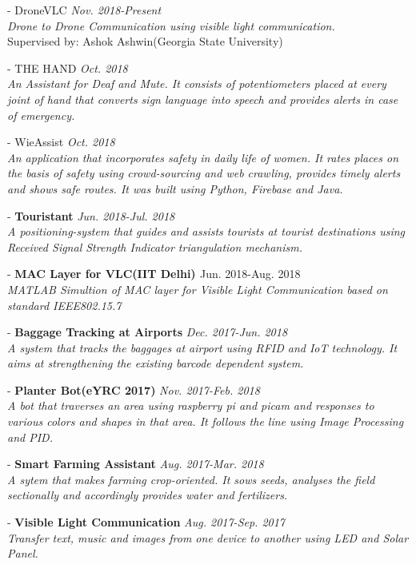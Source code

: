 \documentclass[margin, 10pt]{res} %
\begin{document}
\begin{resume}
- {DroneVLC}
{\sl \hfill {\normalfont Nov. 2018-Present}\\ Drone to Drone Communication using visible light communication.}\\Supervised by: Ashok Ashwin(Georgia State University)

- {THE HAND}
{\sl \hfill {\normalfont Oct. 2018}\\ An Assistant for Deaf and Mute.
It consists of potentiometers placed at every joint of hand that converts sign language into speech and provides alerts in case of emergency.}

- {WieAssist}
{\sl \hfill {\normalfont Oct. 2018}\\ An application that incorporates safety in daily life of women. 
It rates places on the basis of safety using crowd-sourcing and web crawling, provides timely alerts and shows safe routes. It was built using Python, Firebase and Java.}



- {\bf Touristant} 
{\sl \hfill {\normalfont Jun. 2018-Jul. 2018}\\ A positioning-system that guides and assists tourists at tourist destinations using Received Signal Strength Indicator triangulation mechanism. }

- {\bf {MAC Layer for VLC(IIT Delhi) }  }
 { \hfill \normalfont Jun. 2018-Aug. 2018}\\{\sl MATLAB Simultion of MAC layer for Visible Light Communication based on standard IEEE802.15.7}

- {\bf Baggage Tracking at Airports}
{\sl  \hfill {\normalfont Dec. 2017-Jun. 2018 }\\A system that tracks the baggages at airport using RFID and IoT technology. It aims at strengthening the existing barcode dependent system. }

- {\bf Planter Bot(eYRC 2017)} 
 {\sl \hfill {\normalfont Nov. 2017-Feb. 2018}\\A bot that traverses an area using raspberry pi and picam and responses to various colors and shapes in that area. It follows the line using Image Processing and PID.}

- {\bf Smart Farming Assistant}
{\sl \hfill{\normalfont Aug. 2017-Mar. 2018}\\ A sytem that makes farming crop-oriented. It sows seeds, analyses the field sectionally and accordingly provides water and fertilizers.}


- {\bf Visible Light Communication}
{\sl \hfill{\normalfont Aug. 2017-Sep. 2017}\\Transfer text, music and images from one device to another using LED and Solar Panel. }


\end{resume}
\end{document}
